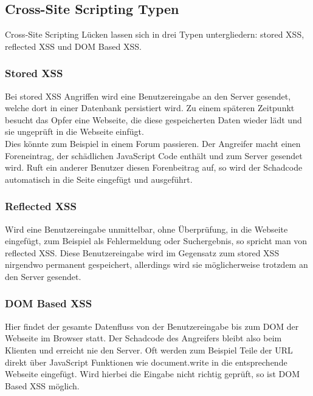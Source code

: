 \subsection{Cross-Site Scripting Typen}
Cross-Site Scripting Lücken lassen sich in drei Typen untergliedern: stored XSS, reflected XSS und DOM Based XSS. \cite{XSSTypes}
\subsubsection{Stored XSS}
Bei stored XSS Angriffen wird eine Benutzereingabe an den Server gesendet, welche dort in einer Datenbank persistiert wird. Zu einem späteren Zeitpunkt besucht das Opfer eine Webseite, die diese gespeicherten Daten wieder lädt und sie ungeprüft in die Webseite einfügt. \\
Dies könnte zum Beispiel in einem Forum passieren. Der Angreifer macht einen Foreneintrag, der schädlichen JavaScript Code enthält und zum Server gesendet wird. Ruft ein anderer Benutzer diesen Forenbeitrag auf, so wird der Schadcode automatisch in die Seite eingefügt und ausgeführt. 
\subsubsection{Reflected XSS}
Wird eine Benutzereingabe unmittelbar, ohne Überprüfung, in die Webseite eingefügt, zum Beispiel als Fehlermeldung oder Suchergebnis, so spricht man von reflected XSS. Diese Benutzereingabe wird im Gegensatz zum stored XSS nirgendwo permanent gespeichert, allerdings wird sie möglicherweise trotzdem an den Server gesendet.
\subsubsection{DOM Based XSS}
Hier findet der gesamte Datenfluss von der Benutzereingabe bis zum DOM der Webseite im Browser statt. Der Schadcode des Angreifers bleibt also beim Klienten und erreicht nie den Server. Oft werden zum Beispiel Teile der URL direkt über JavaScript Funktionen wie document.write in die entsprechende Webseite eingefügt. Wird hierbei die Eingabe nicht richtig geprüft, so ist DOM Based XSS möglich. \cite{XSSDOMBased}

